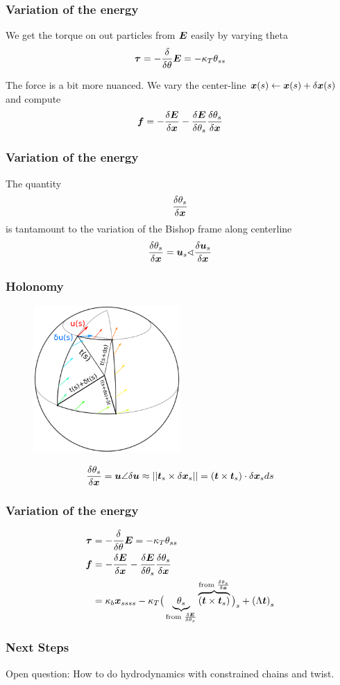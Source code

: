 \documentclass{beamer}
\begin{document}
\begin{frame}
\frametitle{Variation of the energy}
We get the torque on out particles from $\boldsymbol{E}$ easily by varying theta
\[
\boldsymbol{\tau} = -\frac{\delta}{\delta \theta} \boldsymbol{E} = -\kappa_T \theta_{ss}
\]
\begin{alertblock}{The force is a bit more nuanced.}
 We vary the center-line $\boldsymbol{x}(s) \leftarrow \boldsymbol{x}(s) + \delta \boldsymbol{x}(s)$ and compute
\[
\boldsymbol{f} = -\frac{\delta \boldsymbol{E} }{\delta \boldsymbol{x}}   -\frac{\delta \boldsymbol{E}}{\delta \theta_s} \frac{\delta \theta_s}{\delta \boldsymbol{x}} 
\]
\end{alertblock}
\end{frame}

\begin{frame}
\frametitle{Variation of the energy}
The quantity 
\alert<1->{
\[
\frac{\delta \theta_s}{\delta \boldsymbol{x}} 
\]
}
is tantamount to the variation of the Bishop frame along centerline
\[
\frac{\delta \theta_s}{\delta \boldsymbol{x}} = \boldsymbol{u}_s \sphericalangle \frac{\delta \boldsymbol{u}_s}{\delta \boldsymbol{x}}
\]
\end{frame} 

\begin{frame}
\frametitle{Holonomy}
\begin{figure}
\includegraphics[height=0.6\textheight,width=0.5\textwidth]{./Holonomy/Holonomy_Anotated}
\end{figure}
\[
\frac{\delta \theta_s}{\delta \boldsymbol{x}} = \boldsymbol{u} \angle \delta \boldsymbol{u} \approx ||\boldsymbol{t}_{s} \times \delta \boldsymbol{x}_{s} || = \left( \boldsymbol{t} \times \boldsymbol{t}_{s} \right) \cdot \delta \boldsymbol{x}_{s} ds 
\]
\end{frame} 

\begin{frame}
\frametitle{Variation of the energy}
\begin{align}
\boldsymbol{\tau} &= -\frac{\delta}{\delta \theta} \boldsymbol{E} = -\kappa_T \theta_{ss} \\
\boldsymbol{f} &= -\frac{\delta \boldsymbol{E} }{\delta \boldsymbol{x}}   -\frac{\delta \boldsymbol{E}}{\delta \theta_s} \frac{\delta \theta_s}{\delta \boldsymbol{x}} \\
&= \kappa_b \boldsymbol{x}_{ssss}   - \kappa_T \big( \underbrace{\theta_{s}}_{\text{from } \frac{\delta \boldsymbol{E}}{\delta \theta_s}} \overbrace{\left(\boldsymbol{t} \times \boldsymbol{t}_{s}\right)}^{\text{from } \frac{\delta \theta_s}{\delta \boldsymbol{x}}}  \big)_{s} + \left( \Lambda \boldsymbol{t} \right)_s
\end{align}

\end{frame}


\begin{frame}
\frametitle{Next Steps}
\begin{alertblock}{Open question:}
How to do hydrodynamics with constrained chains and twist. 
\end{alertblock}

\end{frame}
\end{document}
